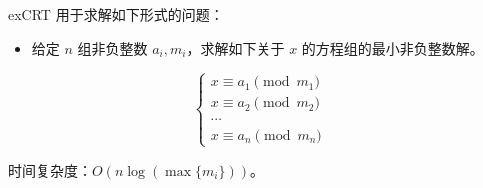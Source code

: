 exCRT 用于求解如下形式的问题：

\begin{itemize}
\item 给定 $n$ 组非负整数 $a_i, m_i$，求解如下关于 $x$ 的方程组的最小非负整数解。
\end{itemize}

$$
\begin{cases}
x \equiv a_1 \pmod{m_1} \\
x \equiv a_2 \pmod{m_2} \\
\cdots \\
x \equiv a_n \pmod{m_n}
\end{cases}
$$

时间复杂度：$O(n\log(\max\{m_i\}))$。